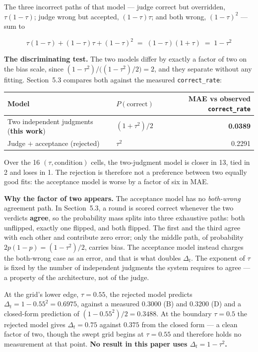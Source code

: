 \documentclass{article}
\begin{document}
The three incorrect paths of that model --- judge correct but overridden, $\tau(1-\tau)$; judge wrong
but accepted, $(1-\tau)\tau$; and both wrong, $(1-\tau)^{2}$ --- sum to

\[
  \tau(1-\tau) + (1-\tau)\tau + (1-\tau)^{2} \;=\; (1-\tau)(1+\tau) \;=\; 1-\tau^{2}
\]

\textbf{The discriminating test.} The two models differ by exactly a factor of two on the bias scale,
since $(1-\tau^{2}) \big/ \bigl((1-\tau^{2})/2\bigr) = 2$, and they separate without any fitting.
Section~5.3 compares both against the measured \texttt{correct\_rate}:

\begin{center}
\small
\begin{tabular}{@{}llr@{}}
  \toprule
  Model & $P(\text{correct})$ & MAE vs observed \texttt{correct\_rate} \\
  \midrule
  Two independent judgments (\textbf{this work}) & $(1 + \tau^{2})/2$ & \textbf{0.0389} \\
  Judge $+$ acceptance (rejected) & $\tau^{2}$ & 0.2291 \\
  \bottomrule
\end{tabular}
\end{center}

Over the 16 $(\tau, \text{condition})$ cells, the two-judgment model is closer in 13, tied in 2 and
loses in 1. The rejection is therefore not a preference between two equally good fits: the acceptance
model is worse by a factor of six in MAE.

\textbf{Why the factor of two appears.} The acceptance model has no \textit{both-wrong} agreement
path. In Section~5.3, a round is scored correct whenever the two verdicts \textbf{agree}, so the
probability mass splits into three exhaustive paths: both unflipped, exactly one flipped, and both
flipped. The first and the third agree with each other and contribute zero error; only the middle
path, of probability $2p(1-p) = (1-\tau^{2})/2$, carries bias. The acceptance model instead charges
the both-wrong case as an error, and that is what doubles $\Delta_t$. The exponent of $\tau$ is fixed
by the number of independent judgments the system requires to agree --- a property of the
architecture, not of the judge.

At the grid's lower edge, $\tau = 0.55$, the rejected model predicts $\Delta_t = 1 - 0.55^{2} =
0.6975$, against a measured 0.3000 (B) and 0.3200 (D) and a closed-form prediction of
$(1 - 0.55^{2})/2 = 0.3488$. At the boundary $\tau = 0.5$ the rejected model gives $\Delta_t = 0.75$
against $0.375$ from the closed form --- a clean factor of two, though the swept grid begins at
$\tau = 0.55$ and therefore holds no measurement at that point. \textbf{No result in this paper uses
$\Delta_t = 1-\tau^{2}$.}
\end{document}
